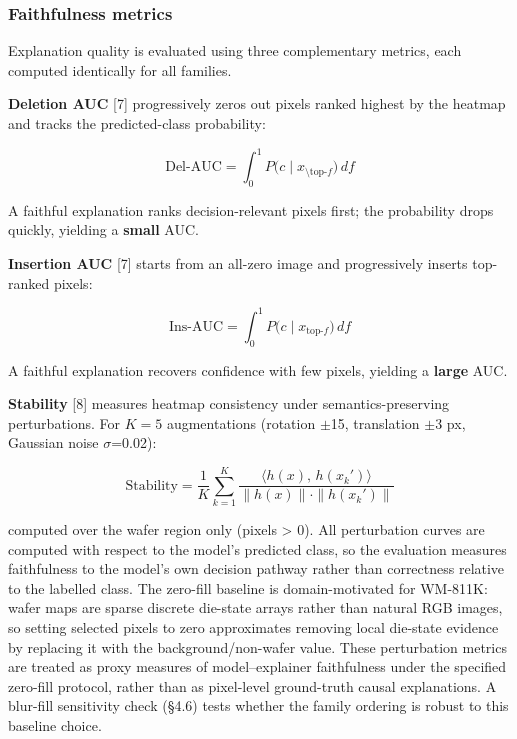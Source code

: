\documentclass[11pt,a4paper]{article}
\begin{document}
\subsubsection{Faithfulness metrics}

Explanation quality is evaluated using three complementary metrics, each computed identically for all families.

\textbf{Deletion AUC} [7] progressively zeros out pixels ranked highest by the heatmap and tracks the predicted-class probability:

\begin{equation}
\text{Del-AUC} = \int_0^1 P\bigl(c \mid x_{\setminus \text{top-}f}\bigr)\, df
\tag{13}
\end{equation}

A faithful explanation ranks decision-relevant pixels first; the probability drops quickly, yielding a \textbf{small} AUC.

\textbf{Insertion AUC} [7] starts from an all-zero image and progressively inserts top-ranked pixels:

\begin{equation}
\text{Ins-AUC} = \int_0^1 P\bigl(c \mid x_{\text{top-}f}\bigr)\, df
\tag{14}
\end{equation}

A faithful explanation recovers confidence with few pixels, yielding a \textbf{large} AUC.

\textbf{Stability} [8] measures heatmap consistency under semantics-preserving perturbations. For $K{=}5$ augmentations (rotation $\pm$15\textdegree{}, translation $\pm$3 px, Gaussian noise $\sigma$=0.02):

\begin{equation}
\text{Stability} = \frac{1}{K}\sum_{k=1}^K \frac{\langle h(x),\, h(x_k')\rangle}{\|h(x)\| \cdot \|h(x_k')\|}
\tag{15}
\end{equation}

computed over the wafer region only (pixels > 0). All perturbation curves are computed with respect to the model's predicted class, so the evaluation measures faithfulness to the model's own decision pathway rather than correctness relative to the labelled class. The zero-fill baseline is domain-motivated for WM-811K: wafer maps are sparse discrete die-state arrays rather than natural RGB images, so setting selected pixels to zero approximates removing local die-state evidence by replacing it with the background/non-wafer value. These perturbation metrics are treated as proxy measures of model--explainer faithfulness under the specified zero-fill protocol, rather than as pixel-level ground-truth causal explanations. A blur-fill sensitivity check (\S{}4.6) tests whether the family ordering is robust to this baseline choice.
\end{document}
